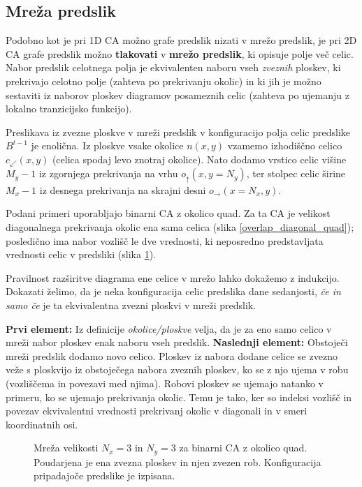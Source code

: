 \documentclass[12pt,a4paper,openany,twoside]{book}
\begin{document}
\subsection{Mreža predslik}

Podobno kot je pri 1D CA možno grafe predslik nizati v mrežo predslik,
je pri 2D CA grafe predslik možno \textbf{tlakovati} v \textbf{mrežo predslik},
ki opisuje polje več celic.
Nabor predslik celotnega polja je ekvivalenten naboru vseh \textit{zveznih} ploskev,
ki prekrivajo celotno polje (zahteva po prekrivanju okolic)
in ki jih je možno sestaviti iz naborov ploskev diagramov posameznih celic
(zahteva po ujemanju z lokalno tranzicijsko funkcijo).

Preslikava iz zvezne ploskve v mreži predslik v konfiguracijo polja celic predslike \(B^{t-1}\) je enolična.
Iz ploskve vsake okolice \(n(x,y)\) vzamemo izhodiščno celico
\(c_{\swarrow}(x,y)\) (celica spodaj levo znotraj okolice).
Nato dodamo vrstico celic višine \(M_y-1\) iz zgornjega prekrivanja na vrhu \(o_{\uparrow}(x,y=N_y)\),
ter stolpec celic širine \(M_x-1\) iz desnega prekrivanja na skrajni desni \(o_{\rightarrow}(x=N_x,y)\).

Podani primeri uporabljajo binarni CA z okolico quad.
Za ta CA je velikost diagonalnega prekrivanja okolic ena sama celica (slika \ref{overlap_diagonal_quad});
posledično ima nabor vozlišč le dve vrednosti, ki neposredno predstavljata
vrednosti celic v predsliki (slika \ref{network_array}).

Pravilnost razširitve diagrama ene celice v mrežo lahko dokažemo z indukcijo.
Dokazati želimo, da je neka konfiguracija celic predslika dane sedanjosti,
\textit{če in samo če} je ta ekvivalentna zvezni ploskvi v mreži predslik.

\textbf{Prvi element:}
Iz definicije \textit{okolice/ploskve} velja,
da je za eno samo celico v mreži nabor ploskev enak naboru vseh predslik.
\textbf{Naslednji element:}
Obstoječi mreži predslik dodamo novo celico.
Ploskev iz nabora dodane celice se zvezno veže s ploskvijo
iz obstoječega nabora zveznih ploskev,
ko se z njo ujema v robu (vozliščema in povezavi med njima).
Robovi ploskev se ujemajo natanko v primeru, ko se ujemajo prekrivanja okolic.
Temu je tako, ker so indeksi vozlišč in povezav ekvivalentni
vrednosti prekrivanj okolic v diagonali in v smeri koordinatnih osi.

\begin{figure}[htb]
\centerline{}
\caption[Mreža polja celic.]{Mreža velikosti \(N_x=3\) in \(N_y=3\) za binarni CA z okolico quad.
Poudarjena je ena zvezna ploskev in njen zvezen rob. Konfiguracija pripadajoče predslike je izpisana.}
\label{network_array}
\end{figure}
\end{document}
